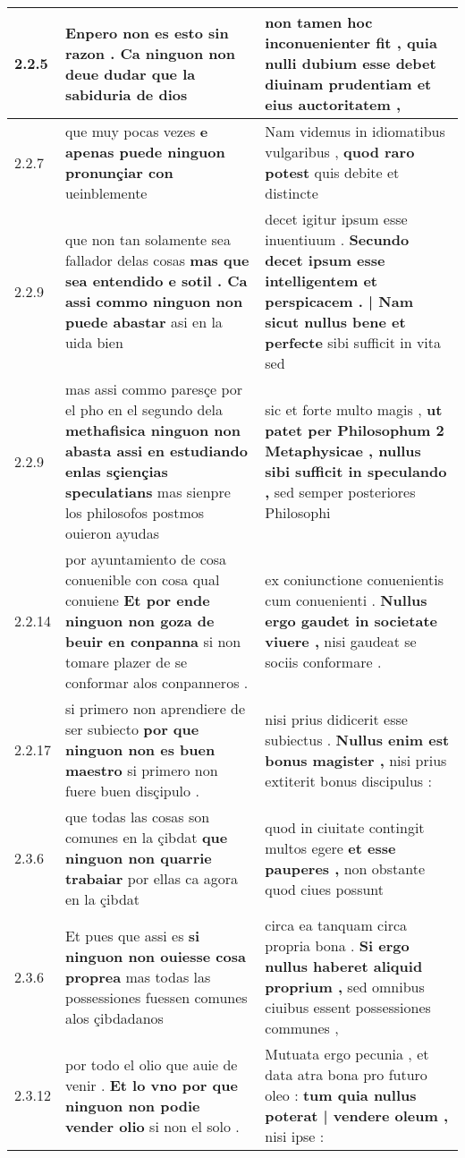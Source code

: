 \begin{tabular}{|p{1cm}|p{6.5cm}|p{6.5cm}|}
2.2.5 & Enpero non es esto sin razon . \textbf{ Ca ninguon non deue dudar } que la sabiduria de dios & non tamen hoc inconuenienter fit , \textbf{ quia nulli dubium esse debet } diuinam prudentiam et eius auctoritatem , \\\hline
2.2.7 & que muy pocas vezes \textbf{ e apenas puede ninguon pronunçiar con } ueinblemente & Nam videmus in idiomatibus vulgaribus , \textbf{ quod raro potest } quis debite et distincte \\\hline
2.2.9 & que non tan solamente sea fallador delas cosas \textbf{ mas que sea entendido e sotil . Ca assi commo ninguon non puede abastar } asi en la uida bien & decet igitur ipsum esse inuentiuum . \textbf{ Secundo decet ipsum esse intelligentem et perspicacem . | Nam sicut nullus bene et perfecte } sibi sufficit in vita sed \\\hline
2.2.9 & mas assi commo paresçe por el pho en el segundo dela \textbf{ methafisica ninguon non abasta assi en estudiando enlas sçiençias speculatians } mas sienpre los philosofos postmos ouieron ayudas & sic et forte multo magis , \textbf{ ut patet per Philosophum 2 Metaphysicae , nullus sibi sufficit in speculando , } sed semper posteriores Philosophi \\\hline
2.2.14 & por ayuntamiento de cosa conuenible con cosa qual conuiene \textbf{ Et por ende ninguon non goza de beuir en conpanna } si non tomare plazer de se conformar alos conpanneros . & ex coniunctione conuenientis cum conuenienti . \textbf{ Nullus ergo gaudet in societate viuere , } nisi gaudeat se sociis conformare . \\\hline
2.2.17 & si primero non aprendiere de ser subiecto \textbf{ por que ninguon non es buen maestro } si primero non fuere buen disçipulo . & nisi prius didicerit esse subiectus . \textbf{ Nullus enim est bonus magister , } nisi prius extiterit bonus discipulus : \\\hline
2.3.6 & que todas las cosas son comunes en la çibdat \textbf{ que ninguon non quarrie trabaiar } por ellas ca agora en la çibdat & quod in ciuitate contingit multos egere \textbf{ et esse pauperes , } non obstante quod ciues possunt \\\hline
2.3.6 & Et pues que assi es \textbf{ si ninguon non ouiesse cosa proprea } mas todas las possessiones fuessen comunes alos çibdadanos & circa ea tanquam circa propria bona . \textbf{ Si ergo nullus haberet aliquid proprium , } sed omnibus ciuibus essent possessiones communes , \\\hline
2.3.12 & por todo el olio que auie de venir . \textbf{ Et lo vno por que ninguon non podie vender olio } si non el solo . & Mutuata ergo pecunia , et data atra bona pro futuro oleo : \textbf{ tum quia nullus poterat | vendere oleum , } nisi ipse : \\\hline

\end{tabular}
